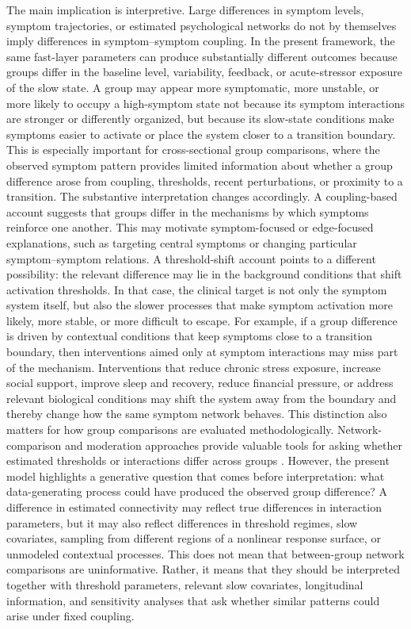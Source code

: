 \documentclass[man,12pt,floatsintext]{apa7}
\begin{document}
The main implication is interpretive. Large differences in symptom levels, symptom trajectories, or estimated psychological networks do not by themselves imply differences in symptom--symptom coupling. In the present framework, the same fast-layer parameters can produce substantially different outcomes because groups differ in the baseline level, variability, feedback, or acute-stressor exposure of the slow state. A group may appear more symptomatic, more unstable, or more likely to occupy a high-symptom state not because its symptom interactions are stronger or differently organized, but because its slow-state conditions make symptoms easier to activate or place the system closer to a transition boundary. This is especially important for cross-sectional group comparisons, where the observed symptom pattern provides limited information about whether a group difference arose from coupling, thresholds, recent perturbations, or proximity to a transition.
The substantive interpretation changes accordingly. A coupling-based account suggests that groups differ in the mechanisms by which symptoms reinforce one another. This may motivate symptom-focused or edge-focused explanations, such as targeting central symptoms or changing particular symptom--symptom relations. A threshold-shift account points to a different possibility: the relevant difference may lie in the background conditions that shift activation thresholds. In that case, the clinical target is not only the symptom system itself, but also the slower processes that make symptom activation more likely, more stable, or more difficult to escape. For example, if a group difference is driven by contextual conditions that keep symptoms close to a transition boundary, then interventions aimed only at symptom interactions may miss part of the mechanism. Interventions that reduce chronic stress exposure, increase social support, improve sleep and recovery, reduce financial pressure, or address relevant biological conditions may shift the system away from the boundary and thereby change how the same symptom network behaves.
This distinction also matters for how group comparisons are evaluated methodologically. Network-comparison and moderation approaches provide valuable tools for asking whether estimated thresholds or interactions differ across groups \parencite{van2023comparing, haslbeck2022estimating}. However, the present model highlights a generative question that comes before interpretation: what data-generating process could have produced the observed group difference? A difference in estimated connectivity may reflect true differences in interaction parameters, but it may also reflect differences in threshold regimes, slow covariates, sampling from different regions of a nonlinear response surface, or unmodeled contextual processes. This does not mean that between-group network comparisons are uninformative. Rather, it means that they should be interpreted together with threshold parameters, relevant slow covariates, longitudinal information, and sensitivity analyses that ask whether similar patterns could arise under fixed coupling.
\end{document}
